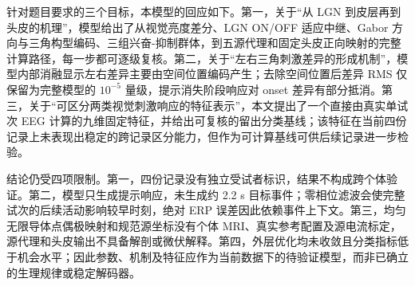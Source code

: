 针对题目要求的三个目标，本模型的回应如下。第一，关于“从 LGN 到皮层再到头皮的机理”，模型给出了从视觉亮度差分、LGN ON/OFF 适应中继、Gabor 方向与三角构型编码、三组兴奋-抑制群体，到五源代理和固定头皮正向映射的完整计算路径，每一步都可逐级复核。第二，关于“左右三角刺激差异的形成机制”，模型内部消融显示左右差异主要由空间位置编码产生；去除空间位置后差异 RMS 仅保留为完整模型的 \(10^{-5}\) 量级，提示消失阶段响应对 onset 差异有部分抵消。第三，关于“可区分两类视觉刺激响应的特征表示”，本文提出了一个直接由真实单试次 EEG 计算的九维固定特征，并给出可复核的留出分类基线；该特征在当前四份记录上未表现出稳定的跨记录区分能力，但作为可计算基线可供后续记录进一步检验。

结论仍受四项限制。第一，四份记录没有独立受试者标识，结果不构成跨个体验证。第二，模型只生成提示响应，未生成约 2.2 s 目标事件；零相位滤波会使完整试次的后续活动影响较早时刻，绝对 ERP 误差因此依赖事件上下文。第三，均匀无限导体点偶极映射和规范源坐标没有个体 MRI、真实参考配置及源电流标定，源代理和头皮输出不具备解剖或微伏解释。第四，外层优化均未收敛且分类指标低于机会水平；因此参数、机制及特征应作为当前数据下的待验证模型，而非已确立的生理规律或稳定解码器。